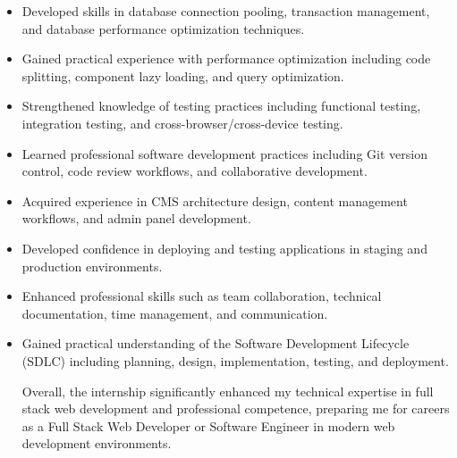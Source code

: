 \begin{itemize}
\item Developed skills in database connection pooling, transaction management, and database performance optimization techniques.

\item Gained practical experience with performance optimization including code splitting, component lazy loading, and query optimization.

\item Strengthened knowledge of testing practices including functional testing, integration testing, and cross-browser/cross-device testing.

\item Learned professional software development practices including Git version control, code review workflows, and collaborative development.

\item Acquired experience in CMS architecture design, content management workflows, and admin panel development.

\item Developed confidence in deploying and testing applications in staging and production environments.

\item Enhanced professional skills such as team collaboration, technical documentation, time management, and communication.

\item Gained practical understanding of the Software Development Lifecycle (SDLC) including planning, design, implementation, testing, and deployment.

Overall, the internship significantly enhanced my technical expertise in full stack web development and professional competence, preparing me for careers as a Full Stack Web Developer or Software Engineer in modern web development environments.

\end{itemize}
